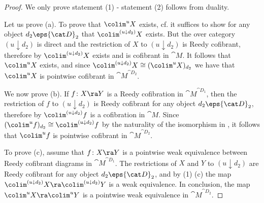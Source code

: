 \begin{proof}
We only prove statement (1) - statement (2) follows from duality.

Let us prove (a). To prove that $\colim^u X$ exists, cf.  it suffices to show for any object $d_2 \eps {\cat D}_2$ that $\colim^{(u \downarrow d_2)} X$ exists. But the over category $(u \downarrow d_2)$ is direct and the restriction of $X$ to $(u \downarrow d_2)$ is Reedy cofibrant, therefore by  $\colim^{(u \downarrow d_2)} X$ exists and is cofibrant in ${\cat M}$. It follows that $\colim^u X$ exists, and since $\colim^{(u \downarrow d_2)} X \cong (\colim^u X)_{d_2}$ we have that $\colim^u X$ is pointwise cofibrant in ${\cat M}^{{\cat D}_2}$.

We now prove (b). If $f \colon X \ra Y$ is a Reedy cofibration in ${\cat M}^{{\cat D}_1}$, then the restriction of $f$ to $(u \downarrow d_2)$ is Reedy cofibrant for any object $d_2 \eps {\cat D}_2$, therefore by  $\colim^{(u \downarrow d_2)} f$ is a cofibration in ${\cat M}$. Since $(\colim^u f)_{d_2} \cong \colim^{(u \downarrow d_2)} f$ by the naturality of the isomorphism in , it follows that $\colim^u f$ is pointwise cofibrant in ${\cat M}^{{\cat D}_2}$.

To prove (c), assume that $f \colon X \ra Y$ is a pointwise weak equivalence between Reedy cofibrant diagrams in ${\cat M}^{{\cat D}_1}$. The restrictions of $X$ and $Y$ to $(u \downarrow d_2)$ are Reedy cofibrant for any object $d_2 \eps {\cat D}_2$, and by  (1) (c) the map $\colim^{(u \downarrow d_2)} X \ra \colim^{(u \downarrow d_2)} Y$ is a weak equivalence. In conclusion, the map $\colim^u X \ra \colim^u Y$ is a pointwise weak equivalence in ${\cat M}^{{\cat D}_2}$.
\end{proof}

